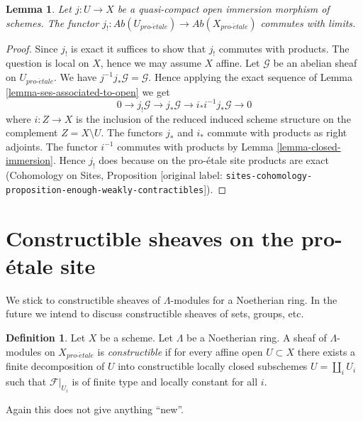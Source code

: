 \documentclass[10pt,a4paper]{article}
\theoremstyle{plain}
\newtheorem{lemma}[subsection]{Lemma}
\theoremstyle{definition}
\newtheorem{definition}[subsection]{Definition}
\theoremstyle{remark}
\numberwithin{equation}{subsection}
\def\proetale{{pro\text{-}\acute{e}tale}}
\begin{document}
\begin{lemma}
\label{lemma-j-shriek-limits}
Let $j : U \to X$ be a quasi-compact open immersion
morphism of schemes. The functor
$j_! : \textit{Ab}(U_\proetale) \to \textit{Ab}(X_\proetale)$
commutes with limits.
\end{lemma}

\begin{proof}
Since $j_!$ is exact it suffices to show that $j_!$ commutes with products.
The question is local on $X$, hence we may assume $X$ affine.
Let $\mathcal{G}$ be an abelian sheaf on $U_\proetale$.
We have $j^{-1}j_*\mathcal{G} = \mathcal{G}$. Hence applying
the exact sequence of Lemma \ref{lemma-ses-associated-to-open}
we get
$$
0 \to j_!\mathcal{G} \to j_*\mathcal{G} \to i_*i^{-1}j_*\mathcal{G} \to 0
$$
where $i : Z \to X$ is the inclusion of the reduced induced scheme
structure on the complement $Z = X \setminus U$.
The functors $j_*$ and $i_*$ commute with products as right adjoints.
The functor $i^{-1}$ commutes with products by
Lemma \ref{lemma-closed-immersion}.
Hence $j_!$ does because on the pro-\'etale site products
are exact
(Cohomology on Sites, Proposition
\textnormal{[original label: \nolinkurl{sites-cohomology-proposition-enough-weakly-contractibles}]}).
\end{proof}




\section{Constructible sheaves on the pro-\'etale site}
\label{section-constructible}

\noindent
We stick to constructible sheaves of $\Lambda$-modules for a
Noetherian ring. In the future we intend to discuss constructible
sheaves of sets, groups, etc.

\begin{definition}
\label{definition-constructible}
Let $X$ be a scheme.
Let $\Lambda$ be a Noetherian ring. A sheaf of $\Lambda$-modules
on $X_\proetale$ is {\it constructible} if for every affine open
$U \subset X$ there exists a finite decomposition
of $U$ into constructible locally closed subschemes
$U = \coprod_i U_i$ such that
$\mathcal{F}|_{U_i}$ is of finite type and locally constant for all $i$.
\end{definition}

\noindent
Again this does not give anything ``new''.
\end{document}
